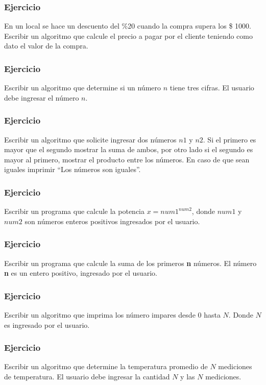 \subsubsection{Ejercicio}
En un local se hace un descuento del \%20 cuando la compra supera los \$ 1000. Escribir un algoritmo que calcule el precio a pagar por el cliente
teniendo como dato el valor de la compra.

\subsubsection{Ejercicio}
Escribir un algoritmo que determine si un número $n$ tiene tres cifras. El usuario debe ingresar el número $n$.

\subsubsection{Ejercicio}
Escribir un algoritmo que solicite ingresar dos números $n1$ y $n2$. Si el primero es mayor que el segundo mostrar la suma de ambos, por otro lado si el segundo es mayor al primero, mostrar el producto entre los números. En caso de que sean iguales imprimir ``Los números son iguales''.

\subsubsection{Ejercicio}
Escribir un programa que calcule la potencia $x={num1}^{num2}$, donde $num1$ y $num2$ son números enteros positivos ingresados por el usuario.

\subsubsection{Ejercicio}
Escribir un programa que calcule la suma de los primeros \textbf{n} números. El número \textbf{n} es un entero positivo, ingresado por el usuario.

\subsubsection{Ejercicio}
Escribir un algoritmo que imprima los número impares desde 0 hasta $N$. Donde $N$ es ingresado por el usuario.

\subsubsection{Ejercicio}
Escribir un algoritmo que determine la temperatura promedio de $N$ mediciones de temperatura. El usuario debe ingresar la cantidad $N$ y las $N$ mediciones. 

